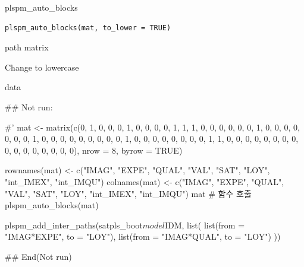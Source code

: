 \documentclass[a4paper]{book}
\begin{document}
%
\begin{Description}
plspm\_auto\_blocks
\end{Description}
%
\begin{Usage}
\begin{verbatim}
plspm_auto_blocks(mat, to_lower = TRUE)
\end{verbatim}
\end{Usage}
%
\begin{Arguments}
\begin{ldescription}
\item[\code{mat}] path matrix

\item[\code{to\_lower}] Change to lowercase
\end{ldescription}
\end{Arguments}
%
\begin{Value}
data
\end{Value}
%
\begin{Examples}
\begin{ExampleCode}


\#\# Not run: 

#'
mat <- matrix(c(0, 1, 0, 0, 0, 1, 0, 0,
                0, 0, 1, 1, 1, 0, 0, 0,
                0, 0, 0, 1, 0, 0, 0, 0,
                0, 0, 0, 1, 0, 0, 0, 0,
                0, 0, 0, 0, 0, 1, 0, 0,
                0, 0, 0, 0, 0, 0, 1, 1,
                0, 0, 0, 0, 0, 0, 0, 0,
                0, 0, 0, 0, 0, 0, 0, 0),
              nrow = 8, byrow = TRUE)

rownames(mat) <- c("IMAG", "EXPE", "QUAL", "VAL", "SAT", "LOY", "int_IMEX", "int_IMQU")
colnames(mat) <- c("IMAG", "EXPE", "QUAL", "VAL", "SAT", "LOY", "int_IMEX", "int_IMQU")
mat
# 함수 호출
plspm_auto_blocks(mat)

plspm_add_inter_paths(satpls_boot$model$IDM, list(
  list(from = "IMAG*EXPE", to = "LOY"),
  list(from = "IMAG*QUAL", to = "LOY")
))%


## End(Not run)

\end{ExampleCode}
\end{Examples}
\end{document}

